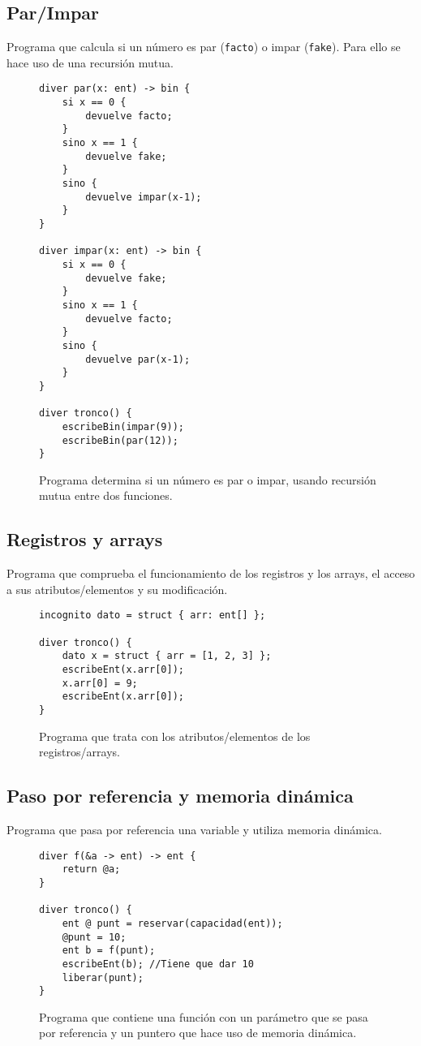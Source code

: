 \subsection{Par/Impar}
Programa que calcula si un número es par (\lstinline{facto}) o impar
(\lstinline{fake}). Para ello se hace uso de una recursión mutua.
\begin{figure}[htbp]
    \centering
    \begin{lstlisting}
diver par(x: ent) -> bin {
    si x == 0 {
        devuelve facto;
    }
    sino x == 1 {
        devuelve fake;
    }
    sino {
        devuelve impar(x-1);
    }
}

diver impar(x: ent) -> bin {
    si x == 0 {
        devuelve fake;
    }
    sino x == 1 {
        devuelve facto;
    }
    sino {
        devuelve par(x-1);
    }
}

diver tronco() {
    escribeBin(impar(9));
    escribeBin(par(12));
}
    \end{lstlisting}
    \caption{Programa determina si un número es par o impar, usando recursión
    mutua entre dos funciones.}
\end{figure}

\subsection{Registros y arrays}
Programa que comprueba el funcionamiento de los registros y los arrays, el
acceso a sus atributos/elementos y su modificación.
\begin{figure}[htbp]
    \centering
    \begin{lstlisting}
incognito dato = struct { arr: ent[] };

diver tronco() {
    dato x = struct { arr = [1, 2, 3] };
    escribeEnt(x.arr[0]);
    x.arr[0] = 9;
    escribeEnt(x.arr[0]);
}
    \end{lstlisting}
    \caption{Programa que trata con los atributos/elementos de los
    registros/arrays.}
\end{figure}

\subsection{Paso por referencia y memoria dinámica}
Programa que pasa por referencia una variable y utiliza memoria dinámica.
\begin{figure}[htbp]
    \centering
    \begin{lstlisting}
diver f(&a -> ent) -> ent {
    return @a;
}

diver tronco() {
    ent @ punt = reservar(capacidad(ent));
    @punt = 10;
    ent b = f(punt);
    escribeEnt(b); //Tiene que dar 10
    liberar(punt);
}
    \end{lstlisting}
    \caption{Programa que contiene una función con un parámetro que se pasa por
    referencia y un puntero que hace uso de memoria dinámica.}
\end{figure}

